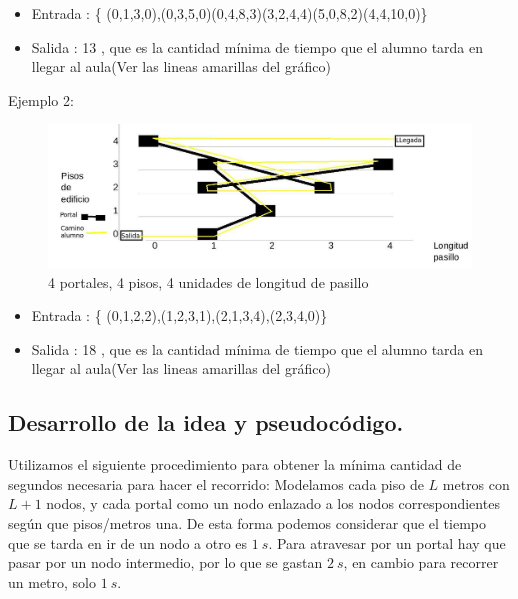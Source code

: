 \begin{itemize}
	\item Entrada : \{ (0,1,3,0),(0,3,5,0)(0,4,8,3)(3,2,4,4)(5,0,8,2)(4,4,10,0)\}
	\item Salida : 13 , que es la cantidad mínima de tiempo que el alumno tarda en llegar al aula(Ver las lineas amarillas del gráfico) 
\end{itemize}

Ejemplo 2: \newline
\begin{figure}[H]
 \begin{center}
     \includegraphics[scale=0.30]{imagenes/ejercicio2ej2.jpg}
 \end{center}
 \caption{ 4 portales, 4 pisos, 4 unidades de longitud de pasillo}
 \label{nCte}
\end{figure}

\begin{itemize}
	\item Entrada : \{ (0,1,2,2),(1,2,3,1),(2,1,3,4),(2,3,4,0)\}
	\item Salida : 18 , que es la cantidad mínima de tiempo que el alumno tarda en llegar al aula(Ver las lineas amarillas del gráfico) 
\end{itemize}
 

\subsection{Desarrollo de la idea y pseudocódigo.}

Utilizamos el siguiente procedimiento para obtener la mínima cantidad de segundos necesaria para hacer el recorrido:
Modelamos cada piso de $ L $ metros con $ L+1 $ nodos, y cada portal como un nodo enlazado a los nodos correspondientes según que pisos/metros una. De esta forma podemos considerar que el tiempo que se tarda en ir de un nodo a otro es $1~s$. Para atravesar por un portal hay que pasar por un nodo intermedio, por lo que se gastan $2~s$, en cambio para recorrer un metro, solo $1~s$.

